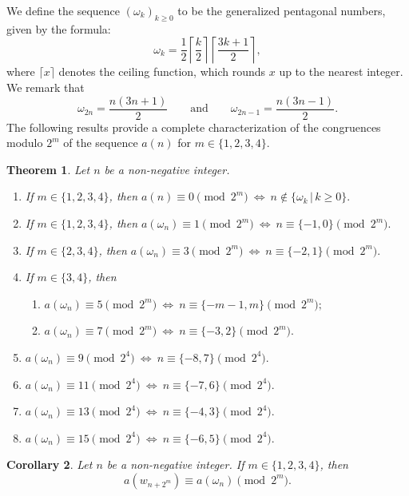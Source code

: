 \documentclass{article}
\newtheorem{theorem}{Theorem}
\newtheorem{corollary}[theorem]{Corollary}
\begin{document}
We define the sequence $(\omega_k)_{k \geq 0}$ to be the generalized pentagonal numbers, given by the formula:
$$
\omega_k = \frac{1}{2} \left\lceil \frac{k}{2} \right\rceil \left\lceil \frac{3k+1}{2} \right\rceil,
$$
where $ \lceil x \rceil $ denotes the ceiling function, which rounds $ x $ up to the nearest integer. We remark that
$$\omega_{2n}=\frac{n(3n+1)}{2}\qquad\text{and}\qquad \omega_{2n-1}=\frac{n(3n-1)}{2}.$$
The following results provide a complete characterization of the congruences modulo $2^m$  of the sequence $a(n)$ for $m \in \{1, 2, 3, 4\}$.

\medskip
\begin{theorem} \label{Th:4}
  Let $n$ be a non-negative integer. 
  \begin{enumerate}
      \item[(a)] If $m\in\{1,2,3,4\}$, then $a(n) \equiv 0 \pmod {2^m}\ \iff\ n\not\in\{\omega_k \,|\, k\geq 0\}.  $
      \item [(b)]  If $m\in\{1,2,3,4\}$, then $a(\omega_n) \equiv 1 \pmod {2^m}\ \iff\ n\equiv \{-1,0\} \pmod {2^m}.$ 
      \item [(c)]  If $m\in\{2,3,4\}$, then $a(\omega_n) \equiv 3 \pmod {2^m}\ \iff\ n\equiv \{-2,1\} \pmod {2^m}.$ 
      \item [(d)]  If $m\in\{3,4\}$, then 
      \begin{enumerate}
          \item [($d_1$)] $a(\omega_n) \equiv 5 \pmod {2^m}\ \iff\ n\equiv \{-m-1,m\} \pmod {2^m};$
          \item [($d_2$)] $a(\omega_n) \equiv 7 \pmod {2^m} \ \iff \ n\equiv \{-3,2\} \pmod {2^m}.$
      \end{enumerate}
      \item [(e)] $a(\omega_n) \equiv 9 \pmod {2^4}\ \iff\ n\equiv \{-8,7\} \pmod {2^4}.$
      \item [(f)] $a(\omega_n) \equiv 11 \pmod {2^4}\ \iff\ n\equiv \{-7,6\} \pmod {2^4}.$
      \item [(g)] $a(\omega_n) \equiv 13 \pmod {2^4}\ \iff\ n\equiv \{-4,3\} \pmod {2^4}.$
      \item [(h)] $a(\omega_n) \equiv 15 \pmod {2^4}\ \iff\ n\equiv \{-6,5\} \pmod {2^4}.$
  \end{enumerate}
\end{theorem}


\medskip
\begin{corollary} \label{Th:5}
    Let $n$ be a non-negative integer. If $m\in\{1,2,3,4\}$, then $$a(w_{n+2^m}) \equiv a(\omega_n) \pmod {2^m}.$$    
\end{corollary}
\medskip
\end{document}
